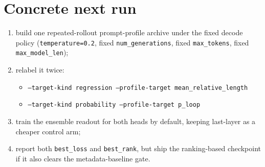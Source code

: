 \documentclass[11pt]{article}
\begin{document}
\section*{Concrete next run}
\begin{enumerate}[leftmargin=1.5em]
\item build one repeated-rollout prompt-profile archive under the fixed decode policy
(\texttt{temperature=0.2}, fixed \texttt{num\_generations}, fixed \texttt{max\_tokens},
fixed \texttt{max\_model\_len});
\item relabel it twice:
  \begin{itemize}[leftmargin=1.5em]
  \item \texttt{--target-kind regression --profile-target mean\_relative\_length}
  \item \texttt{--target-kind probability --profile-target p\_loop}
  \end{itemize}
\item train the ensemble readout for both heads by default, keeping last-layer as
a cheaper control arm;
\item report both \texttt{best\_loss} and \texttt{best\_rank}, but ship the ranking-based
checkpoint if it also clears the metadata-baseline gate.
\end{enumerate}
\end{document}
